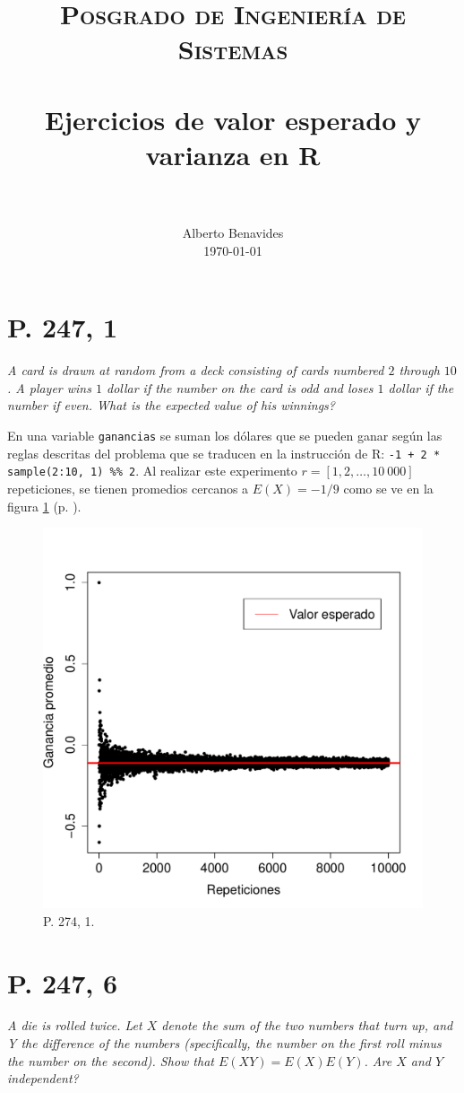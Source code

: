 \documentclass[paper=leter, fontsize=11pt]{scrartcl}
\title{
		\usefont{OT1}{bch}{b}{n}
		\normalfont \normalsize \textsc{Posgrado de Ingeniería de Sistemas} \\ [25pt]
		\horrule{0.5pt} \\[0.4cm]
		\huge Ejercicios de valor esperado y varianza en R \\
		\horrule{2pt} \\[0.5cm]
}
\author{
		\normalfont 								\normalsize
        Alberto Benavides\\[-3pt]		\normalsize
        \today
}
\date{}
\begin{document}
 
\maketitle

\section*{P. 247, 1}
\emph{A card is drawn at random from a deck consisting of cards numbered $2$ through $10$. A player wins $1$ dollar if the number on the card is odd and loses $1$ dollar if the number if even. What is the expected value of his winnings?}

En una variable \texttt{ganancias} se suman los dólares que se pueden ganar según las reglas descritas del problema que se traducen en la instrucción de R: \texttt{-1 + 2 * sample(2:10, 1) \%\% 2}. Al realizar este experimento $r = [1, 2, \ldots, 10\ 000]$ repeticiones, se tienen promedios cercanos a $E(X) = -1/9$ como se ve en la figura \ref{247_1} (p. \pageref{247_1}).

\begin{figure}
    \centering
    \includegraphics[width=1\textwidth]{247_1.pdf}
    \caption{P. 274, 1.}
    \label{247_1}
\end{figure}

\section*{P. 247, 6}
\emph{A die is rolled twice. Let $X$ denote the sum of the two numbers that turn up, and Y the difference of the numbers (specifically, the number on the first roll minus the number on the second). Show that $E(X Y) = E(X)E(Y )$. Are $X$ and $Y$ independent?}
\end{document}

